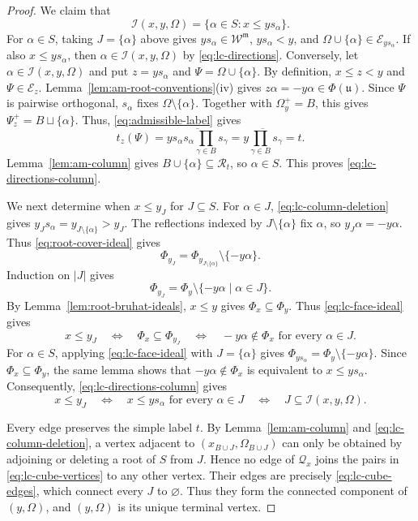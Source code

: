 \documentclass[12pt]{amsart}
\theoremstyle{definition}
\numberwithin{equation}{section}
\newcommand{\m}{\mathfrak m}
\newcommand{\W}{\mathscr W}
\begin{document}
\begin{proof}
We claim that
\begin{equation}\label{eq:lc-directions-column}
\mathscr I(x,y,\Omega)
=\{\alpha\in S:x\leq ys_\alpha\}.
\end{equation}
For $\alpha\in S$, taking $J=\{\alpha\}$ above gives
$ys_\alpha\in\W^{\m}$, $ys_\alpha<y$, and
$\Omega\cup\{\alpha\}\in\mathscr E_{ys_\alpha}$.
If also $x\leq ys_\alpha$, then
$\alpha\in\mathscr I(x,y,\Omega)$ by \eqref{eq:lc-directions}. Conversely, let $\alpha\in\mathscr I(x,y,\Omega)$ and put
$z=ys_\alpha$ and $\Psi=\Omega\cup\{\alpha\}$.
By definition, $x\leq z<y$ and $\Psi\in\mathscr E_z$.
Lemma~\ref{lem:am-root-conventions}\textup{(iv)} gives
$z\alpha=-y\alpha\in\Phi(\mathfrak u)$.
Since $\Psi$ is pairwise orthogonal, $s_\alpha$ fixes
$\Omega\setminus\{\alpha\}$. Together with $\Omega_y^+=B$,
this gives $\Psi_z^+=B\sqcup\{\alpha\}$. Thus,
\eqref{eq:admissible-label} gives
\[
t_z(\Psi)
=\overline{ys_\alpha s_\alpha\prod_{\gamma\in B}s_\gamma}
=\overline{y\prod_{\gamma\in B}s_\gamma}=t.
\]
Lemma~\ref{lem:am-column} gives
$B\cup\{\alpha\}\subseteq\mathscr R_t$, so $\alpha\in S$.
This proves \eqref{eq:lc-directions-column}.

We next determine when $x\leq y_J$ for $J\subseteq S$.
For $\alpha\in J$, \eqref{eq:lc-column-deletion} gives
$y_Js_\alpha=y_{J\setminus\{\alpha\}}>y_J$.
The reflections indexed by $J\setminus\{\alpha\}$ fix $\alpha$,
so $y_J\alpha=-y\alpha$. Thus \eqref{eq:root-cover-ideal} gives
\[
\Phi_{y_J}
=\Phi_{y_{J\setminus\{\alpha\}}}\setminus\{-y\alpha\}.
\]
Induction on $|J|$ gives
\begin{equation}\label{eq:lc-face-ideal}
\Phi_{y_J}=\Phi_y\setminus\{-y\alpha\mid \alpha\in J\}.
\end{equation}
By Lemma~\ref{lem:root-bruhat-ideals},
$x\leq y$ gives $\Phi_x\subseteq\Phi_y$.
Thus \eqref{eq:lc-face-ideal} gives
\[
x\leq y_J
\quad\Longleftrightarrow\quad
\Phi_x\subseteq\Phi_{y_J}
\quad\Longleftrightarrow\quad
-y\alpha\notin\Phi_x\text{ for every }\alpha\in J.
\]
For $\alpha\in S$, applying \eqref{eq:lc-face-ideal}
with $J=\{\alpha\}$ gives
$\Phi_{ys_\alpha}=\Phi_y\setminus\{-y\alpha\}$.
Since $\Phi_x\subseteq\Phi_y$, the same lemma shows that
$-y\alpha\notin\Phi_x$ is equivalent to $x\leq ys_\alpha$.
Consequently, \eqref{eq:lc-directions-column} gives
\[
x\leq y_J
\quad\Longleftrightarrow\quad
x\leq ys_\alpha\text{ for every }\alpha\in J
\quad\Longleftrightarrow\quad
J\subseteq\mathscr I(x,y,\Omega).
\]

Every edge preserves the simple label $t$.
By Lemma~\ref{lem:am-column} and \eqref{eq:lc-column-deletion},
a vertex adjacent to $(x_{B\cup J},\Omega_{B\cup J})$
can only be obtained by adjoining or deleting a root of $S$
from $J$. Hence no edge of $\mathscr Q_x$ joins the pairs
in \eqref{eq:lc-cube-vertices} to any other vertex.
Their edges are precisely \eqref{eq:lc-cube-edges},
which connect every $J$ to $\varnothing$.
Thus they form the connected component of $(y,\Omega)$,
and $(y,\Omega)$ is its unique terminal vertex.


\end{proof}
\end{document}
